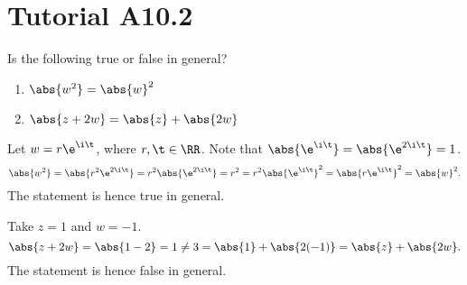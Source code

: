\section{Tutorial A10.2}

\begin{problem}
    Is the following true or false in general?

    \begin{enumerate}
        \item $\abs{w^2} = \abs{w}^2$
        \item $\abs{z + 2w} = \abs{z} + \abs{2w}$
    \end{enumerate}
\end{problem}
\begin{solution}
    \begin{ppart}
        Let $w = r\e^{\i\t}$, where $r, \t \in \RR$. Note that $\abs{\e^{\i\t}} = \abs{\e^{2\i\t}} = 1$. \[\abs{w^2} = \abs{r^2 \e^{2\i\t}} = r^2 \abs{\e^{2\i\t}} = r^2 = r^2 \abs{\e^{\i\t}}^2 = \abs{r\e^{\i\t}}^2 = \abs{w}^2.\] The statement is hence true in general.
    \end{ppart}
    \begin{ppart}
        Take $z = 1$ and $w = -1$. \[\abs{z + 2w} = \abs{1 - 2} = 1 \neq 3 = \abs{1} + \abs{2(-1)} = \abs{z} + \abs{2w}.\] The statement is hence false in general.
    \end{ppart}
\end{solution}

